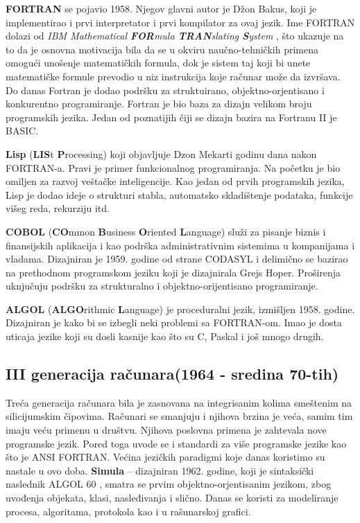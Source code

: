 \documentclass[a4paper]{article}
\begin{document}
\textbf{FORTRAN} se pojavio 1958. Njegov glavni autor je Džon Bakus, koji je implementirao i prvi interpretator i prvi kompilator za ovaj jezik. Ime FORTRAN dolazi od \emph{IBM Mathematical \textbf{FOR}mula \textbf{TRAN}slating \textbf{S}ystem} , što ukazuje na to da je osnovna motivacija bila da se u okviru naučno-tehničkih primena omogući unošenje matematičkih formula, dok je sistem taj koji bi unete matematičke formule prevodio u niz instrukcija koje računar može da izvršava. Do danas Fortran je dodao podršku za struktuirano, objektno-orjentisano i konkurentno programiranje. Fortran je bio baza za dizajn velikom broju programskih jezika. Jedan od poznatijih čiji se dizajn bazira na Fortranu II je BASIC.

\textbf{Lisp} (\textbf{LIS}t \textbf{P}rocessing) koji objavljuje Dzon Mekarti godinu dana nakon FORTRAN-a. Pravi je primer funkcionalnog programiranja. Na početku je bio omiljen za razvoj veštačke inteligencije. Kao jedan od prvih programskih jezika, Lisp je dodao ideje o strukturi stabla, automatsko skladištenje podataka, funkcije višeg reda, rekurziju itd.  

\textbf{COBOL} (\textbf{CO}mmon \textbf{B}usiness \textbf{O}riented \textbf{L}anguage) služi za pisanje biznis i finansijskih aplikacija i kao podrška administrativnim sistemima u kompanijama i vladama. Dizajniran je 1959. godine od strane CODASYL i delimično se bazirao na prethodnom programskom jeziku koji je dizajnirala Grejs Hoper. Proširenja uknjučuju podršku za strukturalno i objektno-orijentisano programiranje. 

\textbf{ALGOL} (\textbf{ALGO}rithmic \textbf{L}anguage) je proceduralni jezik, izmišljen 1958. godine.
Dizajniran je kako bi se izbegli neki problemi sa FORTRAN-om. Imao je dosta uticaja jezike koji su dosli kasnije kao što su C, Paskal i još mnogo drugih.


\subsection{III generacija računara(1964 - sredina 70-tih)}
Treća generacija računara bila je zasnovana na integrisanim kolima smeštenim na silicijumskim čipovima. Računari se smanjuju i njihova brzina je veća, samim tim imaju veću primenu u društvu. Njihova poslovna primena je zahtevala nove programske jezik. Pored toga uvode se i standardi za više programske jezike kao što je ANSI FORTRAN. Većina jezičkih paradigmi koje danas koristimo su nastale u ovo doba.
\textbf{Simula} – dizajniran 1962. godine, koji je sintaksički naslednik ALGOL 60 , smatra se prvim objektno-orjentisanim jezikom, zbog uvođenja objekata, klasi, nasleđivanja i slično. Danas se  koristi  za modeliranje procesa, algoritama, protokola kao i u rašunarskoj grafici.
\end{document}
